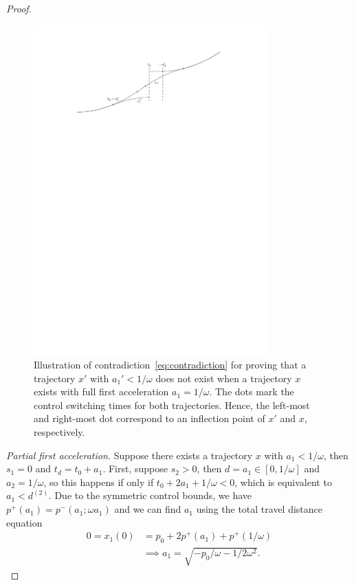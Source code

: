 \documentclass[a4paper]{article}
\theoremstyle{definition}
\theoremstyle{plain}
\begin{document}
\begin{proof}
\begin{figure}
  \centering
  \includegraphics[width=0.80\textwidth]{figures/motion/lemma3_proof1}
  \caption{Illustration of contradiction~\eqref{eq:contradiction} for proving
    that a trajectory $x'$ with $a_{1}' < 1/\omega$ does not exist when a
    trajectory $x$ exists with full first acceleration $a_{1} = 1/\omega$. The
    dots mark the control switching times for both trajectories. Hence, the
    left-most and right-most dot correspond to an inflection point of $x'$ and
    $x$, respectively.}
  \label{fig:lemma3_proof1}
\end{figure}


  \vspace{0.5em}
  \noindent
  \textit{Partial first acceleration.}\; Suppose there exists a trajectory $x$ with
  $a_{1} < 1 / \omega$, then $s_{1} = 0$ and $t_{d} = t_{0} + a_{1}$. First, suppose
  $s_{2} > 0$, then $d = a_{1}\in [0, 1/\omega]$ and $a_{2} = 1/ \omega$, so this
  happens if only if $t_{0} + 2a_{1} + 1/\omega < 0$, which is equivalent to
  $a_{1} < d^{(2)}$.
  Due to the symmetric control bounds, we have
  $p^{+}(a_{1}) = p^{-}(a_{1};\omega a_{1})$ and we can find $a_{1}$ using the
  total travel distance equation
  \begin{align*}
    0 = x_{1}(0) &= p_{0} + 2p^{+}(a_{1}) + p^{+}(1/\omega) \\
    &\implies a_{1} = \sqrt{-p_{0} / \omega - 1/2\omega^{2}} .
  \end{align*}


\end{proof}
\end{document}
